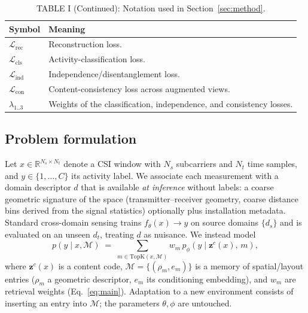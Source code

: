 \documentclass[conference]{IEEEtran}
\newcommand{\zc}{\mathbf{z}^{c}}      %
\begin{document}
\begin{table}[h]
\centering
\caption{TABLE I (Continued): Notation used in Section~\ref{sec:method}.} 
\small
\begin{tabular}{p{}p{}}
\toprule
\textbf{Symbol} & \textbf{Meaning} \\
\midrule
$\mathcal{L}_{\mathrm{rec}}$ & Reconstruction loss. \\
$\mathcal{L}_{\mathrm{cls}}$ & Activity-classification loss. \\
$\mathcal{L}_{\mathrm{ind}}$ & Independence/disentanglement loss. \\
$\mathcal{L}_{\mathrm{con}}$ & Content-consistency loss across augmented views. \\
$\lambda_{1..3}$ & Weights of the classification, independence, and consistency losses. \\
\bottomrule
\end{tabular}
\end{table}

\subsection{Problem formulation}
Let $x\in\mathbb{R}^{N_s\times N_t}$ denote a CSI window with $N_s$ subcarriers and $N_t$
time samples, and $y\in\{1,\dots,C\}$ its activity label. We associate each measurement
with a domain descriptor $d$ that is available \emph{at inference} without labels: a coarse
geometric signature of the space (transmitter--receiver geometry, coarse distance bins
derived from the signal statistics) optionally plus installation metadata. Standard cross-domain sensing trains
$f_\theta(x)\!\to\!y$ on source domains $\{d_s\}$ and is evaluated on an unseen $d_t$,
treating $d$ as nuisance. We instead model
\begin{equation}
p(y\mid x, \mathcal{M}) \;=\; \sum_{m \in \mathrm{TopK}(x,\mathcal{M})} w_m \, p_\phi\!\left(y \mid \zc(x),\, m\right),
\label{eq:main}
\end{equation}
where $\zc(x)$ is a content code, $\mathcal{M}=\{(\rho_m, e_m)\}$ is a memory of
spatial/layout entries ($\rho_m$ a geometric descriptor, $e_m$ its conditioning embedding),
and $w_m$ are retrieval weights (Eq.~\eqref{eq:main}). Adaptation to a new environment
consists of inserting an entry into $\mathcal{M}$; the parameters $\theta,\phi$ are untouched.
\end{document}
